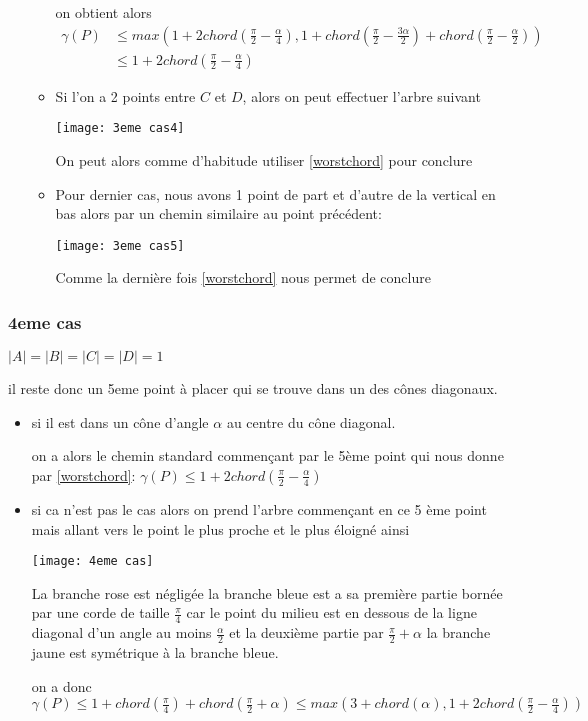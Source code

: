 \begin{itemize}
\begin{itemize}
on obtient alors
\begin{align*}
\gamma(P) &\leq max\left(1+2chord\left(\frac{\pi}{2} - \frac{\alpha}{4}\right), 1 + chord\left(\frac{\pi}{2} - \frac{3\alpha}{2}\right) + chord\left(\frac{\pi}{2} - \frac{\alpha}{2}\right)\right) \\
&\leq 1+2chord\left(\frac{\pi}{2} - \frac{\alpha}{4}\right)
\end{align*}

\item Si l'on a 2 points entre $C$ et $D$, alors on peut effectuer l'arbre suivant

\texttt{[image: 3eme cas4]}

On peut alors comme d'habitude utiliser \ref{worstchord} pour conclure

\item Pour dernier cas, nous avons 1 point de part et d'autre de la vertical en bas alors par un chemin similaire au point précédent:

\texttt{[image: 3eme cas5]}

Comme la dernière fois \ref{worstchord} nous permet de conclure

\end{itemize}
\end{itemize}

\subsubsection*{4eme cas} $|A| = |B| = |C| = |D| = 1$

il reste donc un 5eme point à placer qui se trouve dans un des cônes diagonaux.

\begin{itemize}

\item si il est dans un cône d'angle $\alpha$ au centre du cône diagonal.

on a alors le chemin standard commençant par le 5ème point qui nous donne par \ref{worstchord}: $\gamma(P) \leq 1 + 2chord(\frac{\pi}{2} - \frac{\alpha}{4})$

\item si ca n'est pas le cas alors on prend l'arbre commençant en ce 5 ème point mais allant vers le point le plus proche et le plus éloigné ainsi

\texttt{[image: 4eme cas]}

La branche rose est négligée
la branche bleue est a sa première partie bornée par une corde de taille $\frac{\pi}{4}$ car le point du milieu est en dessous de la ligne diagonal d'un angle au moins $\frac{\alpha}{2}$ et la deuxième partie par $\frac{\pi}{2} + \alpha$
la branche jaune est symétrique à la branche bleue.

on a donc $\gamma(P) \leq 1 + chord(\frac{\pi}{4}) + chord(\frac{\pi}{2} + \alpha) \leq max(3 + chord(\alpha), 1 + 2chord(\frac{\pi}{2} - \frac{\alpha}{4}))$

\end{itemize}

